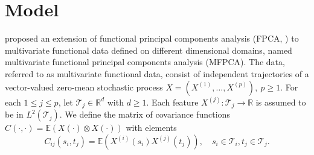 \documentclass{article}
\newcounter{th}
\newcommand{\RR}{\mathbb{R}} %
\begin{document}

\section{Model} %
\label{sec:model}

\cite{happMultivariateFunctionalPrincipal2018} proposed an extension of functional principal components analysis (FPCA, \cite{ramsayFunctionalDataAnalysis2005}) to multivariate functional data defined on different dimensional domains, named multivariate functional principal components analysis (MFPCA). The data, referred to as multivariate functional data, consist of independent trajectories of a vector-valued zero-mean stochastic process $X = (X^{(1)}, \ldots, X^{(p)}),~p \geq 1$. For each $1 \leq j \leq p$, let $\mathcal{T}_j \in \RR^d$ with $d \geq 1$. Each feature $X^{(j)}: \mathcal{T}_j \longrightarrow \RR$ is assumed to be in $L^{2}(\mathcal{T}_j)$. We define the matrix of covariance functions $C(\cdot, \cdot) = \mathbb{E}(X(\cdot) \otimes X(\cdot))$ with elements
\begin{equation}\label{eq:cov}
C_{ij}(s_i, t_j) = \mathbb{E}(X^{(i)}(s_i)X^{(j)}(t_j)), \quad s_i \in \mathcal{T}_i, t_j \in \mathcal{T}_j.    
\end{equation}
\end{document}
